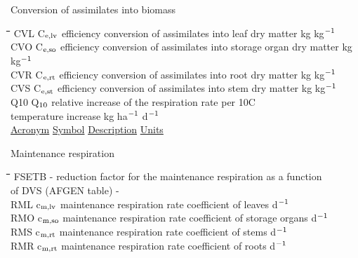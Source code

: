 \documentclass[11pt]{article}
\begin{document}
\bigskip
Conversion of assimilates into biomass\nwln
\begin{tabbing}
\hspace{1.27cm}\=\hspace{1.27cm}\=\hspace{1.27cm}\=\hspace{1.27cm}\=%
\hspace{1.27cm}\=\hspace{1.27cm}\=\hspace{1.27cm}\=\hspace{1.27cm}\=%
\hspace{1.27cm}\=\hspace{1.27cm}\=\kill
CVL\> \> C$_{{\rm e,lv}}$\> efficiency conversion of assimilates into leaf dry matter\> \> \> \> \> \> \> kg kg$^{{\rm -1}}$\\
CVO\> \> C$_{{\rm e,so}}$\> efficiency conversion of assimilates into storage organ dry matter\> \> \> \> \> \> \> kg kg$^{{\rm -1}}$\\
CVR\> \> C$_{{\rm e,rt}}$\> efficiency conversion of assimilates into root dry matter\> \> \> \> \> \> \> kg kg$^{{\rm -1}}$\\
CVS\> \> C$_{{\rm e,st}}$\> efficiency conversion of assimilates into stem dry matter\> \> \> \> \> \> \> kg kg$^{{\rm -1}}$\\
Q10\> \> Q$_{{\rm 10}}$\> relative increase of the respiration rate per 10\degrees C\\
\>\> \> temperature increase\> \> \> \> \> \> \> kg ha$^{{\rm -1}}$ d$^{{\rm -1}}$\\
 \uline{Acronym}\> \> \uline{Symbol}\> \uline{Description}\> \> \> \> \> \> \> \uline{Units}
\end{tabbing}

 \bigskip
Maintenance respiration\nwln
\begin{tabbing}
\hspace{1.27cm}\=\hspace{1.27cm}\=\hspace{1.27cm}\=\hspace{1.27cm}\=%
\hspace{1.27cm}\=\hspace{1.27cm}\=\hspace{1.27cm}\=\hspace{1.27cm}\=%
\hspace{1.27cm}\=\hspace{1.27cm}\=\kill
FSETB\> \> -\> reduction factor for the maintenance respiration as a function \\
\>\> \> of DVS (AFGEN table)\> \> \> \> \> \> \> -\\
RML\> \> c$_{{\rm m,lv}}$\> maintenance respiration rate coefficient of leaves\> \> \> \> \> \> \> d$^{{\rm -1}}$\\
RMO\> \> c$_{{\rm m,so}}$\> maintenance respiration rate coefficient of storage organs\> \> \> \> \> \> \> d$^{{\rm -1}}$\\
RMS\> \> c$_{{\rm m,rt}}$\> maintenance respiration rate coefficient of stems\> \> \> \> \> \> \> d$^{{\rm -1}}$ \\
RMR\> \> c$_{{\rm m,rt}}$\> maintenance respiration rate coefficient of roots\> \> \> \> \> \> \> d$^{{\rm -1}}$ 
\end{tabbing}
\end{document}
